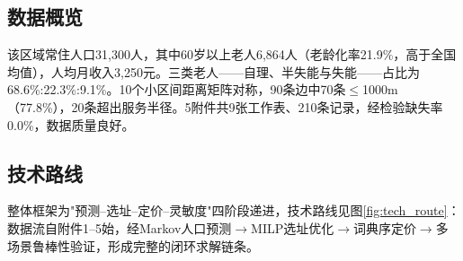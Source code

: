\subsection{数据概览}

该区域常住人口31,300人，其中60岁以上老人6,864人（老龄化率21.9\%，高于全国均值），人均月收入3,250元。三类老人——自理、半失能与失能——占比为68.6\%:22.3\%:9.1\%。10个小区间距离矩阵对称，90条边中70条$\le$1000m（77.8\%），20条超出服务半径。5附件共9张工作表、210条记录，经检验缺失率0.0\%，数据质量良好。

\subsection{技术路线}

整体框架为"预测--选址--定价--灵敏度"四阶段递进，技术路线见图\ref{fig:tech_route}：数据流自附件1--5始，经Markov人口预测$\to$MILP选址优化$\to$词典序定价$\to$多场景鲁棒性验证，形成完整的闭环求解链条。

